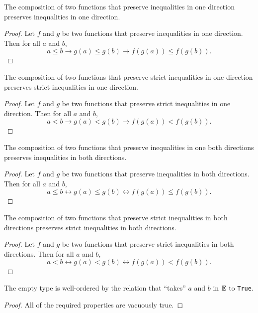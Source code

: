 \documentclass[../../math.tex]{subfiles}
\begin{document}
\begin{instance} \label{homo_le_compose}
    The composition of two functions that preserve inequalities in one direction
    preserves inequalities in one direction.
\end{instance}
\begin{proof}
    Let $f$ and $g$ be two functions that preserve inequalities in one
    direction.  Then for all $a$ and $b$,
    \[
        a \leq b \to g(a) \leq g(b) \to f(g(a)) \leq f(g(b)).
    \]
\end{proof}

\begin{instance}
    The composition of two functions that preserve strict inequalities in one
    direction preserves strict inequalities in one direction.
\end{instance}
\begin{proof}
    Let $f$ and $g$ be two functions that preserve strict inequalities in one
    direction.  Then for all $a$ and $b$,
    \[
        a < b \to g(a) < g(b) \to f(g(a)) < f(g(b)).
    \]
\end{proof}

\begin{instance}
    The composition of two functions that preserve inequalities in one both
    directions preserves inequalities in both directions.
\end{instance}
\begin{proof}
    Let $f$ and $g$ be two functions that preserve inequalities in both
    directions.  Then for all $a$ and $b$,
    \[
        a \leq b \leftrightarrow g(a) \leq g(b) \leftrightarrow f(g(a)) \leq
        f(g(b)).
    \]
\end{proof}

\begin{instance}
    The composition of two functions that preserve strict inequalities in both
    directions preserves strict inequalities in both directions.
\end{instance}
\begin{proof}
    Let $f$ and $g$ be two functions that preserve strict inequalities in both
    directions.  Then for all $a$ and $b$,
    \[
        a < b \leftrightarrow g(a) < g(b) \leftrightarrow f(g(a)) < f(g(b)).
    \]
\end{proof}

\begin{instance}
    The empty type is well-ordered by the relation that ``takes'' $a$ and $b$ in
    $\mathbb{E}$ to \verb|True|.
\end{instance}
\begin{proof}
    All of the required properties are vacuously true.
\end{proof}
\end{document}
